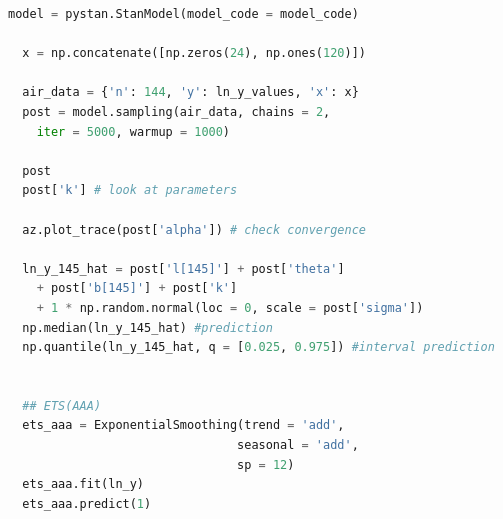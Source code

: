 \documentclass[a4paper, 12pt]{article}
\begin{document}
\begin{lstlisting}[language = Python]
  model = pystan.StanModel(model_code = model_code)

  x = np.concatenate([np.zeros(24), np.ones(120)])

  air_data = {'n': 144, 'y': ln_y_values, 'x': x}
  post = model.sampling(air_data, chains = 2, 
    iter = 5000, warmup = 1000)

  post
  post['k'] # look at parameters

  az.plot_trace(post['alpha']) # check convergence

  ln_y_145_hat = post['l[145]'] + post['theta'] 
    + post['b[145]'] + post['k']
    + 1 * np.random.normal(loc = 0, scale = post['sigma'])
  np.median(ln_y_145_hat) #prediction
  np.quantile(ln_y_145_hat, q = [0.025, 0.975]) #interval prediction


  ## ETS(AAA)
  ets_aaa = ExponentialSmoothing(trend = 'add', 
                                seasonal = 'add',
                                sp = 12)
  ets_aaa.fit(ln_y)
  ets_aaa.predict(1)
\end{lstlisting}
\end{document}
